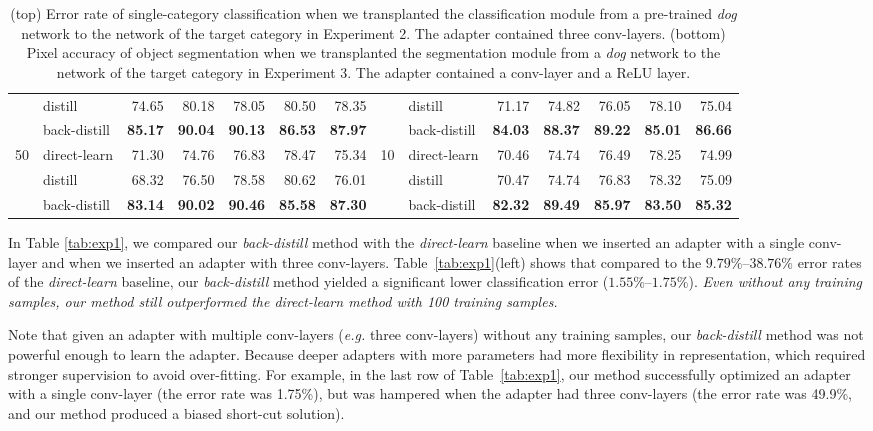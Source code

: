 \documentclass[10pt,twocolumn,letterpaper]{article}
\begin{document}
\begin{table*}
\begin{center}
{\begin{tabular}{cl|rrrrr||cl|rrrrr}
&{distill} &74.65
& 80.18
& 78.05
& 80.50
& 78.35
&&{distill} &71.17
& 74.82
& 76.05
& 78.10
& 75.04\\
&{back-distill} & {\bf85.17}
& {\bf90.04}
& {\bf90.13}
& {\bf86.53}
& {\bf87.97}
&&{back-distill} & {\bf84.03}
& {\bf88.37}
& {\bf89.22}
& {\bf85.01}
& {\bf86.66}\\
\hline
\multirow{3}{*}{50}&{direct-learn}& 71.30
& 74.76
& 76.83
& 78.47
& 75.34
&\multirow{3}{*}{10}&{direct-learn}& 70.46
& 74.74
& 76.49
& 78.25
& 74.99\\
&{distill} &68.32
& 76.50
& 78.58
& 80.62
& 76.01
&&{distill} &70.47
& 74.74
& 76.83
& 78.32
& 75.09\\
&{back-distill} & {\bf83.14}
& {\bf90.02}
& {\bf90.46}
& {\bf85.58}
& {\bf87.30}
&&{back-distill} & {\bf82.32}
& {\bf89.49}
& {\bf85.97}
& {\bf83.50}
& {\bf85.32}\\
\hline
\end{tabular}}
\vspace{2pt}
\caption{(top) Error rate of single-category classification when we transplanted the classification module from a pre-trained \textit{dog} network to the network of the target category in Experiment 2. The adapter contained three conv-layers. (bottom) Pixel accuracy of object segmentation when we transplanted the segmentation module from a \textit{dog} network to the network of the target category in Experiment 3. The adapter contained a conv-layer and a ReLU layer.}
\label{tab:exp23}
\end{center}
\end{table*}

In Table \ref{tab:exp1}, we compared our \textit{back-distill} method with the \textit{direct-learn} baseline when we inserted an adapter with a single conv-layer and when we inserted an adapter with three conv-layers. Table~\ref{tab:exp1}(left) shows that compared to the $9.79\%$--$38.76\%$ error rates of the \textit{direct-learn} baseline, our \textit{back-distill} method yielded a significant lower classification error ($1.55\%$--$1.75\%$). \textit{Even without any training samples, our method still outperformed the \textit{direct-learn} method with 100 training samples.}

Note that given an adapter with multiple conv-layers (\emph{e.g.} three conv-layers) without any training samples, our \textit{back-distill} method was not powerful enough to learn the adapter. Because deeper adapters with more parameters had more flexibility in representation, which required stronger supervision to avoid over-fitting. For example, in the last row of Table~\ref{tab:exp1}, our method successfully optimized an adapter with a single conv-layer (the error rate was 1.75\%), but was hampered when the adapter had three conv-layers (the error rate was 49.9\%, and our method produced a biased short-cut solution).
\end{document}
